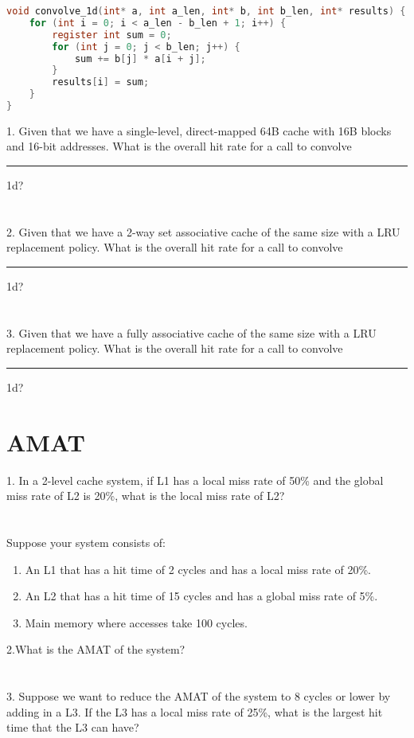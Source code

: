 \documentclass{article}
\begin{document}
\lstset{
  basicstyle=\ttfamily,
  breaklines=true,
  frame=single,
}

\begin{lstlisting}[language=C]
void convolve_1d(int* a, int a_len, int* b, int b_len, int* results) {
    for (int i = 0; i < a_len - b_len + 1; i++) {
        register int sum = 0;
        for (int j = 0; j < b_len; j++) {
            sum += b[j] * a[i + j];
        }
        results[i] = sum;
    }
}
\end{lstlisting}
1. Given that we have a single-level, direct-mapped 64B cache with 16B blocks and 16-bit addresses. What is the overall hit rate for a call to convolve\rule{0.2cm}{0.4pt}1d?\\
\\
\\
2. Given that we have a 2-way set associative cache of the same size with a LRU replacement policy. What is the overall hit rate for a call to convolve\rule{0.2cm}{0.4pt}1d?\\
\\
\\
3. Given that we have a fully associative cache of the same size with a LRU replacement policy. What is the overall hit rate for a call to convolve\rule{0.2cm}{0.4pt}1d?\\

\section{AMAT}
1. In a 2-level cache system, if L1 has a local miss rate of 50\% and the global miss rate of L2 is 20\%, what is the local miss rate of L2?\\
\\
\\
Suppose your system consists of:\par
\begin{enumerate}
    \item An L1 that has a hit time of 2 cycles and has a local miss rate of 20\%.
    \item An L2 that has a hit time of 15 cycles and has a global miss rate of 5\%.
    \item Main memory where accesses take 100 cycles.
\end{enumerate}
2.What is the AMAT of the system?\\
\\
\\
3. Suppose we want to reduce the AMAT of the system to 8 cycles or lower by adding in a L3. If the L3 has a local miss rate of 25\%, what is the largest hit time that the L3 can have?\\
\end{document}
